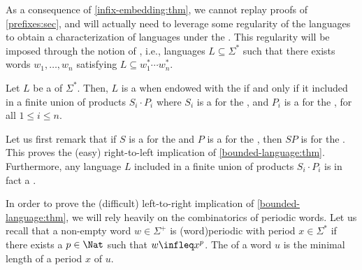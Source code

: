 \AP As a consequence of \cref{infix-embedding:thm}, we cannot replay
proofs of \cref{prefixes:sec}, and will
actually need to leverage some regularity of the languages to obtain a
characterization of  languages under the . This regularity will be imposed through the notion of , i.e., languages $L \subseteq \Sigma^*$ such that there exists words
$w_1, \dots, w_n$ satisfying $L \subseteq w_1^* \cdots w_n^*$.

\begin{theorem}[restate=bounded-language:thm,label=bounded-language:thm]
    \label{bounded-language:thm}
    Let $L$ be a  of $\Sigma^*$. Then,
    $L$ is a  when endowed with the 
     if and only if it included in a finite union of 
    products $S_i \cdot P_i$ where 
    $S_i$ is a  for the , and 
    $P_i$ is a  for the ,
    for all $1 \leq i \leq n$.
\end{theorem}

Let us first remark that if $S$ is a  for the 
and $P$ is a  for the , then $SP$ is
 for the . This proves the (easy)
right-to-left implication of \cref{bounded-language:thm}. Furthermore, any
language $L$ included in a finite union of products $S_i \cdot P_i$
is in fact a . 

\AP In order to prove the (difficult) left-to-right implication of
\cref{bounded-language:thm}, we will rely heavily on the
combinatorics of periodic words. Let us recall that a non-empty word $w \in
\Sigma^+$ is \intro(word){periodic} with period $x \in \Sigma^*$ if there
exists a $p \in \Nat$ such that $w \infleq x^p$. The  of
a word $u$ is the minimal length of a period $x$ of $u$.

